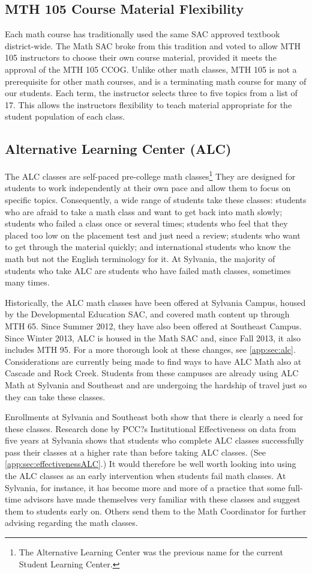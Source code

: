 \subsection{MTH 105 Course Material Flexibility}
Each math course has traditionally used the same SAC approved textbook district-wide.  The Math SAC broke from this tradition and voted to allow MTH 105 instructors to choose their own course material, provided it meets the approval of the MTH 105 CCOG.  Unlike other math classes, MTH 105 is not a prerequisite for other math courses, and is a terminating math course for many of our students.  Each term, the instructor selects three to five topics from a list of 17.  This allows the instructors flexibility to teach material appropriate for the student population of each class.

\subsection{Alternative Learning Center (ALC)}
The ALC classes are self-paced pre-college math classes\footnote{The Alternative Learning Center was the previous name for the current Student Learning Center.}  They are designed for students to work independently at their own pace and allow them to focus on specific topics.  Consequently, a wide range of students take these classes: students who are afraid to take a math class and want to get back into math slowly; students who failed a class once or several times; students who feel that they placed too low on the placement test and just need a review; students who want to get through the material quickly; and international students who know the math but not the English terminology for it.  At Sylvania, the majority of students who take ALC are students who have failed math classes, sometimes many times.

Historically, the ALC math classes have been offered at Sylvania Campus, housed by the Developmental Education SAC, and covered math content up through MTH 65.  Since Summer 2012, they have also been offered at Southeast Campus.  Since Winter 2013, ALC is housed in the Math SAC and, since Fall 2013, it also includes MTH 95. For a more thorough look at these changes, see \vref{app:sec:alc}. Considerations are currently being made to find ways to have ALC Math also at Cascade and Rock Creek.  Students from these campuses are already using ALC Math at Sylvania and Southeast and are undergoing the hardship of travel just so they can take these classes.

Enrollments at Sylvania and Southeast both show that there is clearly a need for these classes.  Research done by PCC?s Institutional Effectiveness on data from five years at Sylvania shows that students who complete ALC classes successfully pass their classes at a higher rate than before taking ALC classes.  (See \vref{app:sec:effectivenessALC}.)  It would therefore be well worth looking into using the ALC classes as an early intervention when students fail math classes.  At Sylvania, for instance, it has become more and more of a practice that some full-time advisors have made themselves very familiar with these classes and suggest them to students early on.  Others send them to the Math Coordinator for further advising regarding the math classes.
 

